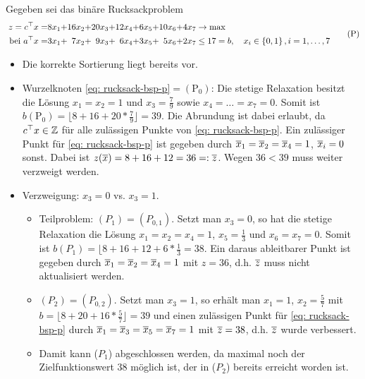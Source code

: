 \begin{beispiel}
	Gegeben sei das binäre Rucksackproblem 
	\begin{equation*}
		\begin{alignedat}{8}
		z = c^{\top} x &= &8x_1 &+ &16x_2 &+ &20x_3 &+ &12x_4 &+ &6x_5 &+ &10x_6 &+ &4x_7 &\to \max \\
		\text{ bei } a^{\top} x &= &3x_1 &+ &7x_2 &+ &9x_3 &+ &6x_4 &+ &3x_5 &+ &5x_6 &+ &2x_7 &\le 17 = b, \quad x_i \in \left\{ 0,1 \right\}, i = 1, \dots, 7
		\end{alignedat}
		\tag{P} \label{eq: rucksack-bsp-p}
	\end{equation*}
	
	\begin{itemize}[leftmargin=*]
		\item Die korrekte Sortierung liegt bereits vor.
		\item Wurzelknoten \eqref{eq: rucksack-bsp-p}$=(\text{P}_0)$: Die stetige Relaxation besitzt die Lösung $x_1 = x_2 = 1$ und $x_3 = \frac{7}{9}$ sowie $x_4 = \dots = x_7 = 0$. Somit ist $b(\text{P}_0) = \lfloor 8 + 16 + 20 * \frac{7}{9} \rfloor = 39$. Die Abrundung ist dabei erlaubt, da $c^{\top} x \in \mathbb{Z}$ für alle zulässigen Punkte von \eqref{eq: rucksack-bsp-p}. Ein zulässiger Punkt für \eqref{eq: rucksack-bsp-p} ist gegeben durch $\overline{x}_1 = \overline{x}_2 = \overline{x}_4 = 1$, $\overline{x}_i = 0$ sonst. Dabei ist $z(\overline{x}) = 8 + 16 + 12 = 36 \mathrel{=:} \overline{z}$. Wegen $36 < 39$ muss weiter verzweigt werden.
		\item Verzweigung: $x_3 = 0$ vs. $x_3 = 1$.
		\begin{itemize}
			\item Teilproblem: $(P_1) = (P_{0,1})$. Setzt man $x_3 = 0$, so hat die stetige Relaxation die Lösung $x_1 = x_2 = x_4 = 1$, $x_5 = \frac{1}{3}$ und $x_6 = x_7 = 0$. Somit ist $b(P_1) = \lfloor 8 + 16 + 12 + 6 * \frac{1}{3} = 38$. Ein daraus ableitbarer Punkt ist gegeben durch $\overline{x}_1 = \overline{x}_2 = \overline{x}_4 = 1$ mit $z = 36$, d.h. $\overline{z}$ muss nicht aktualisiert werden.
			\item $(P_2) = (P_{0,2})$. Setzt man $x_3 = 1$, so erhält man $x_1 = 1$, $x_2 = \frac{5}{7}$ mit $b = \lfloor 8 + 20 + 16 * \frac{5}{7} \rfloor = 39$ und einen zulässigen Punkt für \eqref{eq: rucksack-bsp-p} durch $\overline{x}_1 = \overline{x}_3 = \overline{x}_5 = \overline{x}_7 = 1$ mit $\overline{z} = 38$, d.h. $\overline{z}$ wurde verbessert.
			\item Damit kann ($P_1$) abgeschlossen werden, da maximal noch der Zielfunktionswert $38$ möglich ist, der in ($P_2$) bereits erreicht worden ist.

\end{itemize}
\end{itemize}
\end{beispiel}
